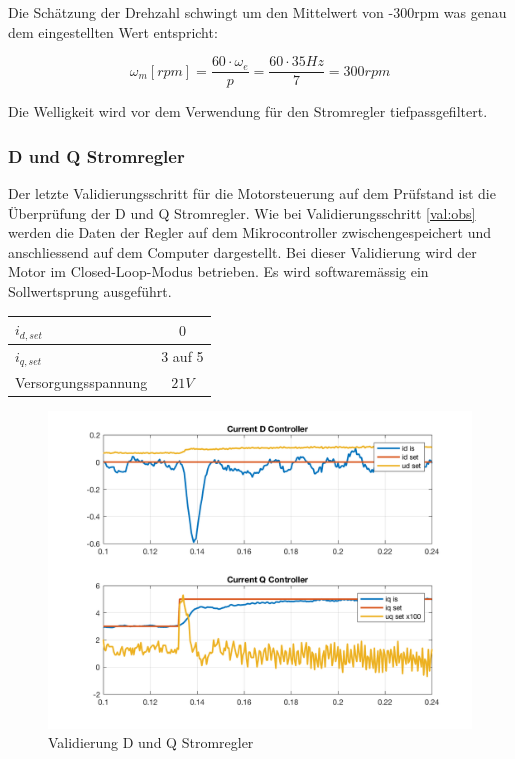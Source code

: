 Die Schätzung der Drehzahl schwingt um den Mittelwert von -300rpm was genau dem eingestellten Wert entspricht:

\begin{equation}
	\omega_m [rpm] = \frac{60 \cdot \omega_e}{p} = \frac{60 \cdot 35Hz}{7} = 300rpm
\end{equation}

Die Welligkeit wird vor dem Verwendung für den Stromregler tiefpassgefiltert.

\subsubsection*{D und Q Stromregler}
Der letzte Validierungsschritt für die Motorsteuerung auf dem Prüfstand ist die Überprüfung der D und Q Stromregler. Wie bei Validierungsschritt \ref{val:obs} werden die Daten der Regler auf dem Mikrocontroller zwischengespeichert und anschliessend auf dem Computer dargestellt. Bei dieser Validierung wird der Motor im Closed-Loop-Modus betrieben. Es wird softwaremässig ein Sollwertsprung ausgeführt.

\begin{center}
	\begin{tabular}{l|c}
		\hline 
		$i_{d,set}$ & $0$ \\ \hline
		$i_{q,set}$ & 3 auf 5 \\ \hline
		Versorgungsspannung & $21V$ \\ \hline
	\end{tabular} 
	\label{tab:regmessbed}
\end{center}

\begin{figure} [H]
	\centering
	\includegraphics[width=0.8\linewidth]{images/valmccontrollers.png}
	\caption{Validierung D und Q Stromregler}
	\label{fig:reg}
\end{figure}

